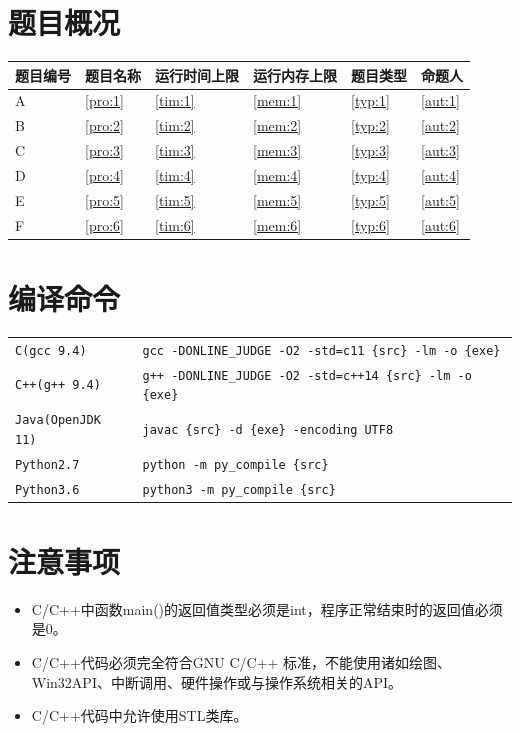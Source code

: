 \documentclass[
	lang=cn,
	color=green
]{elegantbook}
\begin{document}
\begin{titlepage}
	\section*{题目概况}
	\begin{tabularx}{450pt}{X|X|X|X|X|X}
		\toprule
		\textbf{题目编号} & \textbf{题目名称} & \textbf{运行时间上限} & \textbf{运行内存上限} & \textbf{题目类型} & \textbf{命题人} \\
		\midrule
		A                 & \ref*{pro:1}      & \ref*{tim:1}          & \ref*{mem:1}          & \ref*{typ:1}      & \ref*{aut:1}    \\
		B                 & \ref*{pro:2}      & \ref*{tim:2}          & \ref*{mem:2}          & \ref*{typ:2}      & \ref*{aut:2}    \\
		C                 & \ref*{pro:3}      & \ref*{tim:3}          & \ref*{mem:3}          & \ref*{typ:3}      & \ref*{aut:3}    \\
		D                 & \ref*{pro:4}      & \ref*{tim:4}          & \ref*{mem:4}          & \ref*{typ:4}      & \ref*{aut:4}    \\
		E                 & \ref*{pro:5}      & \ref*{tim:5}          & \ref*{mem:5}          & \ref*{typ:5}      & \ref*{aut:5}    \\
		F                 & \ref*{pro:6}      & \ref*{tim:6}          & \ref*{mem:6}          & \ref*{typ:6}      & \ref*{aut:6}    \\
		\bottomrule
	\end{tabularx}

	\section*{编译命令}
	\small
	\begin{tabularx}{450pt}{l|X}
		\toprule
		\verb|C(gcc 9.4)| & \verb|gcc -DONLINE_JUDGE -O2 -std=c11 {src} -lm -o {exe}|  \\
		\verb|C++(g++ 9.4)| & \verb|g++ -DONLINE_JUDGE -O2 -std=c++14 {src} -lm -o {exe}|  \\
		\verb|Java(OpenJDK 11)| & \verb|javac {src} -d {exe} -encoding UTF8|  \\
		\verb|Python2.7| & \verb|python -m py_compile {src}|  \\
		\verb|Python3.6| & \verb|python3 -m py_compile {src}| \\
		\bottomrule
	\end{tabularx}
	\normalsize

	\section*{注意事项}
	\begin{itemize}
		\item C/C++中函数main()的返回值类型必须是int，程序正常结束时的返回值必须是0。
		\item C/C++代码必须完全符合GNU C/C++ 标准，不能使用诸如绘图、Win32API、中断调用、硬件操作或与操作系统相关的API。
		\item C/C++代码中允许使用STL类库。
	\end{itemize}


\end{titlepage}
\end{document}
